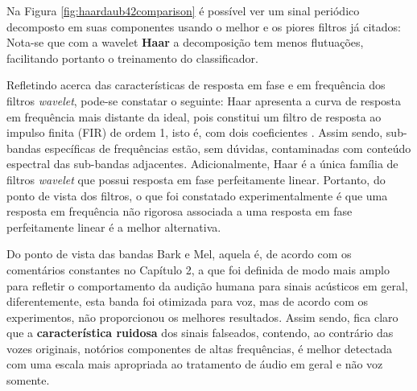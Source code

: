 	\par Na Figura \ref{fig:haardaub42comparison} é possível ver um sinal periódico decomposto em suas componentes usando o melhor e os piores filtros já citados: Nota-se que com a wavelet \textbf{Haar} a decomposição tem menos flutuações, facilitando portanto o treinamento do classificador.\\
		
	\par Refletindo acerca das características de resposta em fase e em frequência dos filtros \textit{wavelet}, pode-se constatar o seguinte: Haar apresenta a curva de resposta em frequência mais distante da ideal, pois constitui um filtro de resposta ao impulso finita (FIR) de ordem 1, isto é, com dois coeficientes \cite{WaveletPropertiesBrowser}. Assim sendo, sub-bandas específicas de frequências estão, sem dúvidas, contaminadas com conteúdo espectral das sub-bandas adjacentes. Adicionalmente, Haar é a única família de filtros \textit{wavelet} que possui resposta em fase perfeitamente linear. Portanto, do ponto de vista dos filtros, o que foi constatado experimentalmente é que uma resposta em frequência não rigorosa associada a uma resposta em fase perfeitamente linear é a melhor alternativa.\\
	
	\par Do ponto de vista das bandas Bark e Mel, aquela é, de acordo com os comentários constantes no Capítulo 2, a que foi definida de modo mais amplo para refletir o comportamento da audição humana para sinais acústicos em geral, diferentemente, esta banda foi otimizada para voz, mas de acordo com os experimentos, não proporcionou os melhores resultados. Assim sendo, fica claro que a \textbf{característica ruidosa} dos sinais falseados, contendo, ao contrário das vozes originais, notórios componentes de altas frequências, é melhor detectada com uma escala mais apropriada ao tratamento de áudio em geral e não voz somente.\\
	
